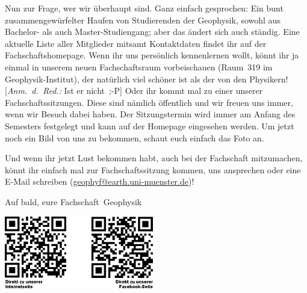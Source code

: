 \begin{multicols*}{2}
Nun zur Frage, wer wir überhaupt sind. Ganz einfach gesprochen: Ein bunt zusammengewürfelter Haufen von Studierenden der Geophysik, sowohl aus Bachelor- als auch Master-Studiengang; aber das ändert sich auch ständig. Eine aktuelle Liste aller Mitglieder mitsamt Kontaktdaten findet ihr auf der Fachschaftshomepage. Wenn ihr uns persönlich kennenlernen wollt, könnt ihr ja einmal in unserem neuen Fachschaftsraum vorbeischauen (Raum~319 im Geophysik-Institut), der natürlich viel schöner ist als der von den Physikern! [\textit{Anm.~d.~Red.:} Ist er nicht~;-P] Oder ihr kommt mal zu einer unserer Fachschaftssitzungen. Diese sind nämlich öffentlich und wir freuen uns immer, wenn wir Besuch dabei haben. Der Sitzungstermin wird immer am Anfang des Semesters festgelegt und kann auf der Homepage eingesehen werden. Um jetzt noch ein Bild von uns zu bekommen, schaut euch einfach das Foto an.

Und wenn ihr jetzt Lust bekommen habt, auch bei der Fachschaft mitzumachen, könnt ihr einfach mal zur Fachschaftssitzung kommen, uns ansprechen oder eine E-Mail schreiben (\url{geophyf@earth.uni-muenster.de})! 

Auf bald, eure Fachschaft~Geophysik

\begin{center}
\includegraphics[width=6.5cm]{res/fs_geophysik_qr_code.png}
\end{center}
\end{multicols*}

